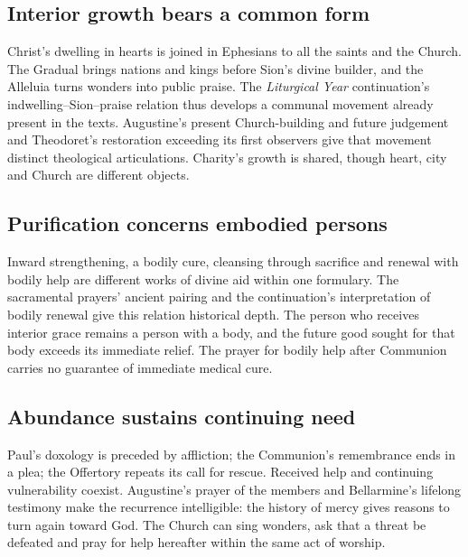 \subsection*{Interior growth bears a common form}
Christ's dwelling in hearts is joined in Ephesians to all the saints and the Church. The Gradual brings nations and kings before Sion's divine builder, and the Alleluia turns wonders into public praise. The \textit{Liturgical Year} continuation's indwelling--Sion--praise relation thus develops a communal movement already present in the texts. Augustine's present Church-building and future judgement and Theodoret's restoration exceeding its first observers give that movement distinct theological articulations. Charity's growth is shared, though heart, city and Church are different objects. 

\subsection*{Purification concerns embodied persons}
Inward strengthening, a bodily cure, cleansing through sacrifice and renewal with bodily help are different works of divine aid within one formulary. The sacramental prayers' ancient pairing and the continuation's interpretation of bodily renewal give this relation historical depth. The person who receives interior grace remains a person with a body, and the future good sought for that body exceeds its immediate relief. The prayer for bodily help after Communion carries no guarantee of immediate medical cure. 

\subsection*{Abundance sustains continuing need}
Paul's doxology is preceded by affliction; the Communion's remembrance ends in a plea; the Offertory repeats its call for rescue. Received help and continuing vulnerability coexist. Augustine's prayer of the members and Bellarmine's lifelong testimony make the recurrence intelligible: the history of mercy gives reasons to turn again toward God. The Church can sing wonders, ask that a threat be defeated and pray for help hereafter within the same act of worship. 
